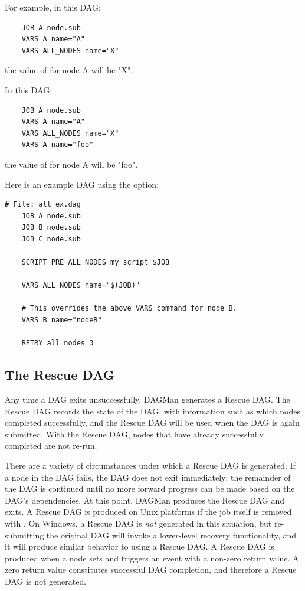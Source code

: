 For example, in this DAG:
\begin{verbatim}
    JOB A node.sub
    VARS A name="A"
    VARS ALL_NODES name="X"
\end{verbatim}
the value of  for node A will be "X".

In this DAG:
\begin{verbatim}
    JOB A node.sub
    VARS A name="A"
    VARS ALL_NODES name="X"
    VARS A name="foo"
\end{verbatim}
the value of  for node A will be "foo".

Here is an example DAG using the  option:
\begin{verbatim}
# File: all_ex.dag
    JOB A node.sub
    JOB B node.sub
    JOB C node.sub

    SCRIPT PRE ALL_NODES my_script $JOB

    VARS ALL_NODES name="$(JOB)"

    # This overrides the above VARS command for node B.
    VARS B name="nodeB"

    RETRY all_nodes 3
\end{verbatim}

\subsection{\label{sec:DAGMan-rescue}The Rescue DAG}

Any time a DAG exits unsuccessfully, DAGMan generates a Rescue DAG.  
The Rescue DAG records the state of the DAG, 
with information such as which nodes completed successfully,
and the Rescue DAG will be used when the DAG is again submitted.
With the Rescue DAG,
nodes that have already successfully completed are not re-run.

There are a variety of circumstances under which a Rescue DAG
is generated.
If a node in the DAG fails, the DAG does not exit immediately;
the remainder of the DAG is continued until no more forward
progress can be made based on the DAG's dependencies.
At this point, DAGMan produces the Rescue DAG and exits.
A Rescue DAG is produced on Unix platforms if the
 job itself is removed with .
On Windows, a Rescue DAG is \emph{not} generated in this situation,
but re-submitting the original DAG will invoke a lower-level 
recovery functionality,
and it will produce similar behavior to using a Rescue DAG.
A Rescue DAG is produced when a node sets and triggers
an  event with a non-zero return value.
A zero return value constitutes successful DAG completion, 
and therefore a Rescue DAG is not generated.

